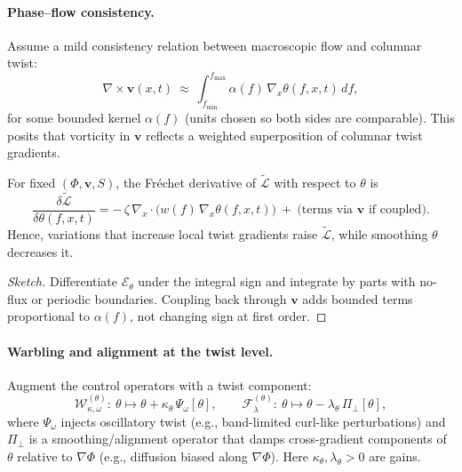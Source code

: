 \documentclass[a4paper,11pt]{article}
\begin{document}
\paragraph{Phase–flow consistency.}
Assume a mild consistency relation between macroscopic flow and columnar twist:
\[
\nabla\times \mathbf{v}(x,t)\ \approx\ \int_{f_{\min}}^{f_{\max}} \alpha(f)\,\nabla_x \theta(f,x,t)\,df,
\]
for some bounded kernel $\alpha(f)$ (units chosen so both sides are comparable).
This posits that vorticity in $\mathbf{v}$ reflects a weighted superposition of
columnar twist gradients.

\begin{lemma}
\label{lem:first-var-theta}
For fixed $(\Phi,\mathbf{v},S)$, the Fréchet derivative of $\widetilde{\mathcal{L}}$
with respect to $\theta$ is
\[
\frac{\delta \widetilde{\mathcal{L}}}{\delta \theta(f,x,t)}
= -\,\zeta\,\nabla_x\!\cdot\!\big(w(f)\,\nabla_x \theta(f,x,t)\big)\ +\ \text{(terms via $\mathbf{v}$ if coupled)}.
\]
Hence, variations that increase local twist gradients raise $\widetilde{\mathcal{L}}$,
while smoothing $\theta$ decreases it.
\end{lemma}

\begin{proof}[Sketch]
Differentiate $\mathcal{E}_\theta$ under the integral sign and integrate by parts
with no-flux or periodic boundaries. Coupling back through $\mathbf{v}$ adds
bounded terms proportional to $\alpha(f)$, not changing sign at first order.
\end{proof}

\paragraph{Warbling and alignment at the twist level.}
Augment the control operators with a twist component:
\[
\mathcal{W}^{(\theta)}_{\kappa,\omega}:\ \theta \mapsto \theta + \kappa_\theta\,\Psi_\omega[\theta],\qquad
\mathcal{F}^{(\theta)}_{\lambda}:\ \theta \mapsto \theta - \lambda_\theta\,\Pi_\perp[\theta],
\]
where $\Psi_\omega$ injects oscillatory twist (e.g., band-limited curl-like
perturbations) and $\Pi_\perp$ is a smoothing/alignment operator that damps
cross-gradient components of $\theta$ relative to $\nabla\Phi$ (e.g., diffusion
biased along $\nabla\Phi$). Here $\kappa_\theta,\lambda_\theta>0$ are gains.
\end{document}
